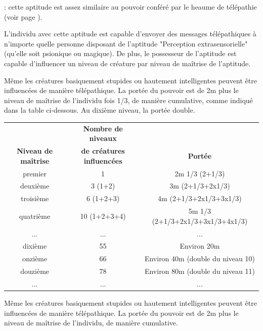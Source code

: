 \documentclass[11pt]{article}
\newcommand{\uline}[1]{\underline{\smash{#1}\vphantom{T}}\vphantom{#1}}
\begin{document}
{\bigskip

\label{magicien-projection-telepathique}\textbf{\uline{Projection télépathique (3/tour)}} : cette aptitude est assez similaire au pouvoir conféré par le heaume de télépathie (voir page \pageref{heaume-telepathie}).

\bigskip

L'individu avec cette aptitude est capable d'envoyer des messages télépathiques à n'importe quelle personne  disposant de l'aptitude "Perception extrasensorielle" (qu'elle soit psionique ou magique). De plus, le possesseur de l'aptitude est capable d'influencer un niveau de créature par niveau de maîtrise de l'aptitude.

\bigskip

Même les créatures basiquement stupides ou hautement intelligentes peuvent être influencées de manière télépathique. La portée du pouvoir est de 2m plus le niveau de maîtrise de l'individu fois 1/3, de manière cumulative, comme indiqué dans la table ci-dessous. Au dixième niveau, la portée double.

\bigskip

\begin{tabular}{ccc}
                            &\textbf{Nombre de niveaux} &\\
\textbf{Niveau de maîtrise} & \textbf{de créatures influencées} & \textbf{Portée}\\
premier     & 1             & 2m 1/3 (2+1/3)\\
deuxième    & 3 (1+2)       & 3m (2+1/3+2x1/3)\\
troisième   & 6 (1+2+3)     & 4m (2+1/3+2x1/3+3x1/3)\\
quatrième   & 10 (1+2+3+4)  & 5m 1/3 (2+1/3+2x1/3+3x1/3+4x1/3)\\
...         & ...           & ...\\
dixième     & 55            & Environ 20m \\
onzième     & 66            & Environ 40m (double du niveau 10) \\
douzième    & 78            & Environ 80m (double du niveau 11) \\
...         & ...           & ... \\
\end{tabular}

\bigskip

Même les créatures basiquement stupides ou hautement intelligentes peuvent être influencées de manière télépathique. La portée du pouvoir est de 2m plus le niveau de maîtrise de l'individu, de manière cumulative.

}
\end{document}
